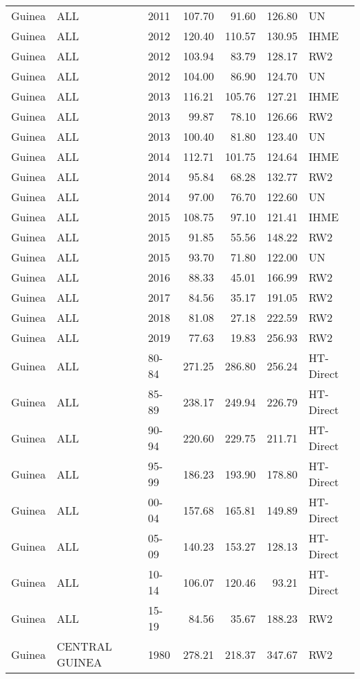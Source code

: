 \begin{longtable}{lllrrrl}
  Guinea & ALL & 2011 & 107.70 & 91.60 & 126.80 & UN \\ 
  Guinea & ALL & 2012 & 120.40 & 110.57 & 130.95 & IHME \\ 
  Guinea & ALL & 2012 & 103.94 & 83.79 & 128.17 & RW2 \\ 
  Guinea & ALL & 2012 & 104.00 & 86.90 & 124.70 & UN \\ 
  Guinea & ALL & 2013 & 116.21 & 105.76 & 127.21 & IHME \\ 
  Guinea & ALL & 2013 & 99.87 & 78.10 & 126.66 & RW2 \\ 
  Guinea & ALL & 2013 & 100.40 & 81.80 & 123.40 & UN \\ 
  Guinea & ALL & 2014 & 112.71 & 101.75 & 124.64 & IHME \\ 
  Guinea & ALL & 2014 & 95.84 & 68.28 & 132.77 & RW2 \\ 
  Guinea & ALL & 2014 & 97.00 & 76.70 & 122.60 & UN \\ 
  Guinea & ALL & 2015 & 108.75 & 97.10 & 121.41 & IHME \\ 
  Guinea & ALL & 2015 & 91.85 & 55.56 & 148.22 & RW2 \\ 
  Guinea & ALL & 2015 & 93.70 & 71.80 & 122.00 & UN \\ 
  Guinea & ALL & 2016 & 88.33 & 45.01 & 166.99 & RW2 \\ 
  Guinea & ALL & 2017 & 84.56 & 35.17 & 191.05 & RW2 \\ 
  Guinea & ALL & 2018 & 81.08 & 27.18 & 222.59 & RW2 \\ 
  Guinea & ALL & 2019 & 77.63 & 19.83 & 256.93 & RW2 \\ 
  Guinea & ALL & 80-84 & 271.25 & 286.80 & 256.24 & HT-Direct \\ 
  Guinea & ALL & 85-89 & 238.17 & 249.94 & 226.79 & HT-Direct \\ 
  Guinea & ALL & 90-94 & 220.60 & 229.75 & 211.71 & HT-Direct \\ 
  Guinea & ALL & 95-99 & 186.23 & 193.90 & 178.80 & HT-Direct \\ 
  Guinea & ALL & 00-04 & 157.68 & 165.81 & 149.89 & HT-Direct \\ 
  Guinea & ALL & 05-09 & 140.23 & 153.27 & 128.13 & HT-Direct \\ 
  Guinea & ALL & 10-14 & 106.07 & 120.46 & 93.21 & HT-Direct \\ 
  Guinea & ALL & 15-19 & 84.56 & 35.67 & 188.23 & RW2 \\ 
  Guinea & CENTRAL GUINEA & 1980 & 278.21 & 218.37 & 347.67 & RW2 \\ 

\end{longtable}
